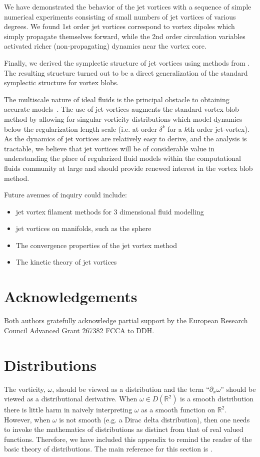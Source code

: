\documentclass[12pt]{amsart}
\newcommand{\R}{\ensuremath{\mathbb{R}}}
\theoremstyle{remark}
\begin{document}
We have demonstrated the behavior of the jet vortices with a sequence of simple numerical experiments consisting of small numbers of jet vortices of various degrees.
We found 1st order jet vortices correspond to vortex dipoles which simply propagate themselves forward, while the 2nd order circulation variables activated richer (non-propagating) dynamics near the vortex core.

Finally, we derived the symplectic structure of jet vortices using methods from  \cite{MarsdenWeinstein1983}.
The resulting structure turned out to be a direct generalization of the standard
symplectic structure for vortex blobs.

The multiscale nature of ideal fluids is the principal obstacle to obtaining accurate models~\cite[Ch. 3]{Chorin1994}.
The use of jet vortices augments the standard vortex blob method by allowing for singular vorticity distributions which model dynamics below the regularization length scale (i.e. at order $\delta^k$ for a $k$th order jet-vortex). As the dynamics of jet vortices are relatively easy to derive, and the analysis is tractable, we believe that jet vortices will be of considerable value in understanding the place of regularized fluid models within the computational fluids community at large
and should provide renewed interest in the vortex blob method.

Future avenues of inquiry could include:
\begin{itemize}
	\item jet vortex filament methods for $3$ dimensional fluid modelling
	\item jet vortices on manifolds, such as the sphere
	\item The convergence properties of the jet vortex method
	\item The kinetic theory of jet vortices
\end{itemize}

\section{Acknowledgements}
Both authors gratefully acknowledge partial support by the European Research
Council Advanced Grant 267382 FCCA to DDH.

\appendix

\section{Distributions}
\label{sec:distributions}
The vorticity, $\omega$, should be viewed as a distribution
and the term ``$\partial_x \omega$'' should be viewed
as a distributional derivative.
When $\omega \in D(\R^2)$ is a smooth distribution there is little harm in naively interpreting $\omega$ as a smooth function on $\R^2$.
However, when $\omega$ is not smooth (e.g. a Dirac delta distribution),
then one needs to invoke the mathematics of distributions
as distinct from that of real valued functions.
Therefore, we have included this appendix to remind the reader of the basic theory of distributions.
The main reference for this section is \cite{Hormander2003}.
\end{document}
